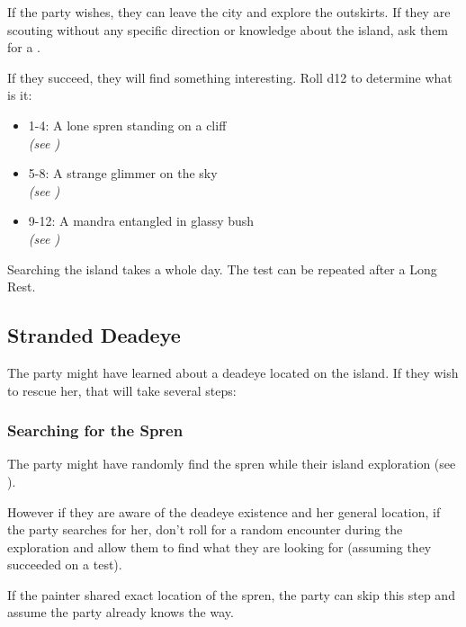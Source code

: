 If the party wishes, they can leave the city and explore the outskirts. If they are scouting without any specific direction or knowledge about the island, ask them for a . 

If they succeed, they will find something interesting. Roll d12 to determine what is it:

\begin{itemize}
	\item 1-4: A lone spren standing on a cliff \\ \textit{(see )} 
	\item 5-8: A strange glimmer on the sky \\ \textit{(see )}
	\item 9-12: A mandra entangled in glassy bush \\ \textit{(see )}
\end{itemize}

Searching the island takes a whole day. The test can be repeated after a Long Rest.




\subsection{Stranded Deadeye}
\label{ssec:celebrantDeadeye}

The party might have learned about a deadeye located on the island. If they wish to rescue her, that will take several steps:

\subsubsection{Searching for the Spren}

The party might have randomly find the spren while their island exploration (see ). 

However if they are aware of the deadeye existence and her general location, if the party searches for her, don't roll for a random encounter during the exploration and allow them to find what they are looking for (assuming they succeeded on a \skillSurvival{} test).

If the painter shared exact location of the spren, the party can skip this step and assume the party already knows the way.

